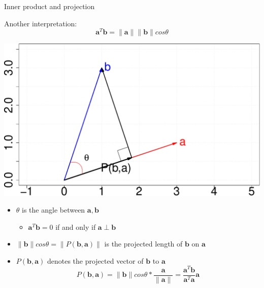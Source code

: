 \documentclass{scrartcl}
\def\tightlist{}
\newcommand{\vv}[1]{\boldsymbol{#1}}
\begin{document}
\begin{frame}{Inner product and projection}
\protect\hypertarget{inner-product-and-projection}{}

Another interpretation:
\[\vv{a}^T \vv{b} = \|\vv{a}\| \|\vv{b}\|cos \theta\]

\begin{center}\includegraphics[width=0.45\linewidth]{math4ml_files/figure-beamer/unnamed-chunk-5-1} \end{center}

\begin{itemize}
\tightlist
\item
  \(\theta\) is the angle between \(\vv{a}, \vv{b}\)

  \begin{itemize}
  \tightlist
  \item
    \(\vv{a}^T\vv{b}=0\) if and only if \(\vv{a} \perp \vv{b}\) 
  \end{itemize}
\item
  \(\|\vv{b}\|cos \theta = \|P(\vv{b}, \vv{a})\|\) is the projected
  length of \(\vv{b}\) on \(\vv{a}\)
\item
  \(P(\vv{b}, \vv{a})\) denotes the projected vector of \(\vv{b}\) to
  \(\vv{a}\)
  \[P(\vv{b}, \vv{a}) = \|\vv{b}\|cos \theta * \frac{\vv{a}}{\|\vv{a}\|} =  \frac{\vv{a}^T\vv{b}}{\vv{a}^T\vv{a}}  \vv{a}\]
\end{itemize}

\end{frame}
\end{document}
